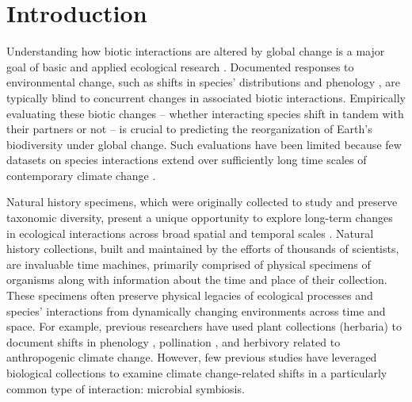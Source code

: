 \documentclass[11pt]{article}
\let\cite\citep
\begin{document}
	\section*{Introduction}
	
	
Understanding how biotic interactions are altered by global change is a major goal of basic and applied ecological research \cite{gilman2010framework,blois2013climate}.
Documented responses to environmental change, such as shifts in species' distributions \cite{aitken2008adaptation} and phenology \cite{piao2019plant}, are typically blind to concurrent changes in associated biotic interactions.
Empirically evaluating these biotic changes -- whether interacting species shift in tandem with their partners or not \cite{hillerislambers2013will} -- is crucial to predicting the reorganization of Earth's biodiversity under global change. 
Such evaluations have been limited because few datasets on species interactions extend over sufficiently long time scales of contemporary climate change \cite{poisot2021global}.

Natural history specimens, which were originally collected to study and preserve taxonomic diversity, present a unique opportunity to explore long-term changes in ecological interactions across broad spatial and temporal scales \citep{meineke2018unrealized}. 
Natural history collections, built and maintained by the efforts of thousands of scientists, are invaluable time machines, primarily comprised of physical specimens of organisms along with information about the time and place of their collection. 
These specimens often preserve physical legacies of ecological processes and species' interactions from dynamically changing environments across time and space.
For example, previous researchers have used plant collections (herbaria) to document shifts in phenology \citep{willis2017old, park2019herbarium,  berg2019examination}, pollination \citep{pauw2011reconstruction, duan2019century}, and herbivory \citep{meineke2019herbarium} related to anthropogenic climate change. 
However, few previous studies have leveraged biological collections to examine climate change-related shifts in a particularly common type of interaction: microbial symbiosis.
\end{document}
